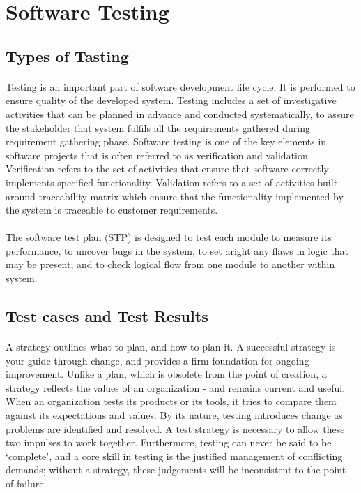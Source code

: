\section{Software Testing}
\subsection{Types of Tasting}
\paragraph{}Testing is an important part of software development life cycle.  It is performed to ensure quality of the developed system.  Testing includes a set of investigative activities that can be planned in advance and conducted systematically, to assure the stakeholder that system fulfils all the requirements gathered during requirement gathering phase.  Software testing is one of the key elements in software projects that is often referred to as verification and validation.  Verification refers to the set of activities that ensure that software correctly implements specified functionality. Validation refers to a set of activities built around traceability matrix which ensure that the functionality implemented by the system is traceable to customer requirements.

\paragraph{}The software test plan (STP) is designed to test each module to measure its performance, to uncover bugs in the system, to set aright any flaws in logic that may be present, and to check logical flow from one module to another within system.

\subsection{Test cases and Test Results}
\paragraph{}A strategy outlines what to plan, and how to plan it. A successful strategy is your guide through
change, and provides a firm foundation for ongoing improvement. Unlike a plan, which is obsolete
from the point of creation, a strategy reflects the values of an organization - and remains current
and useful. When an organization tests its products or its tools, it tries to compare them against
its expectations and values. By its nature, testing introduces change as problems are identified and
resolved. A test strategy is necessary to allow these two impulses to work together. Furthermore,
testing can never be said to be `complete’, and a core skill in testing is the justified management
of conflicting demands; without a strategy, these judgements will be inconsistent to the point of
failure.
